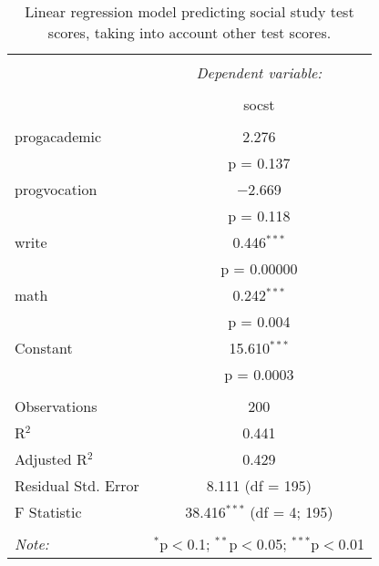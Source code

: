 
\begin{table}[!htbp] \centering 
  \caption{Linear regression model predicting social study test scores, taking into 
          account other test scores.} 
  \label{tab::lm_socst_peeking} 
\begin{tabular}{@{\extracolsep{5pt}}lc} 
\\[-1.8ex]\hline 
\hline \\[-1.8ex] 
 & \multicolumn{1}{c}{\textit{Dependent variable:}} \\ 
\cline{2-2} 
\\[-1.8ex] & socst \\ 
\hline \\[-1.8ex] 
 progacademic & 2.276 \\ 
  & p = 0.137 \\ 
  progvocation & $-$2.669 \\ 
  & p = 0.118 \\ 
  write & 0.446$^{***}$ \\ 
  & p = 0.00000 \\ 
  math & 0.242$^{***}$ \\ 
  & p = 0.004 \\ 
  Constant & 15.610$^{***}$ \\ 
  & p = 0.0003 \\ 
 \hline \\[-1.8ex] 
Observations & 200 \\ 
R$^{2}$ & 0.441 \\ 
Adjusted R$^{2}$ & 0.429 \\ 
Residual Std. Error & 8.111 (df = 195) \\ 
F Statistic & 38.416$^{***}$ (df = 4; 195) \\ 
\hline 
\hline \\[-1.8ex] 
\textit{Note:}  & \multicolumn{1}{r}{$^{*}$p$<$0.1; $^{**}$p$<$0.05; $^{***}$p$<$0.01} \\ 
\end{tabular} 
\end{table} 
